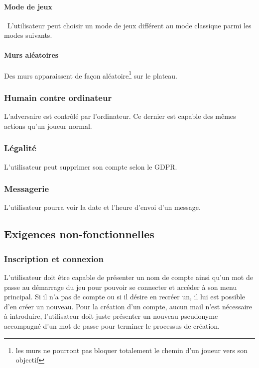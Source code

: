 \documentclass[french, utf8]{article}
\begin{document}
\paragraph{Mode de jeux}
\
L'utilisateur peut choisir un mode de jeux différent au mode classique parmi les modes suivants.
\paragraph{Murs aléatoires}

Des murs apparaissent de façon aléatoire\footnote{les murs ne pourront pas bloquer totalement le chemin d'un joueur vers son objectif} sur le plateau.
\subsubsection{Humain contre ordinateur}

L'adversaire est contrôlé par l'ordinateur. Ce dernier est capable des mêmes actions qu'un joueur normal.


\subsubsection{Légalité}
L'utilisateur peut supprimer son compte selon le GDPR.

\subsubsection{Messagerie}
L'utilisateur pourra voir la date et l'heure d'envoi d'un message.

\subsection{Exigences non-fonctionnelles}
\subsubsection{Inscription et connexion}
L'utilisateur doit être capable de présenter un nom de compte ainsi qu'un mot de passe au démarrage du jeu pour pouvoir se connecter et accéder à son menu principal. Si il n'a pas de compte ou si il désire en recréer un, il lui est possible d'en créer un nouveau. Pour la création d'un compte, aucun mail n'est nécessaire à introduire, l'utilisateur doit juste présenter un nouveau pseudonyme accompagné d'un mot de passe pour terminer le processus de création. \newline
\end{document}
